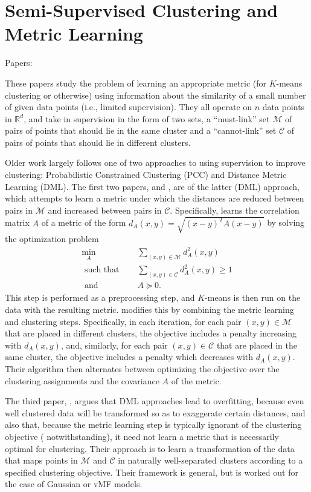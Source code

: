 \documentclass{article} %
\newcommand{\R}{\mathbb{R}}                         %
\newcommand{\C}{\mathcal{C}}                        %
\newcommand{\M}{\mathcal{M}}                        %
\begin{document}
\section{Semi-Supervised Clustering and Metric Learning}
Papers:
    \cite{xing02metriclearning,
          bilenko04metriclearning,
          gopal14supervisedclust}

These papers study the problem of learning an appropriate metric (for
$K$-means clustering or otherwise) using information about the similarity of
a small number of given data points (i.e., limited supervision). They all
operate on $n$ data points in $\R^d$, and take in supervision in the form of
two sets, a ``must-link'' set $\M$ of pairs of points that should lie in the
same cluster and a ``cannot-link'' set $\C$ of pairs of points that should lie
in different clusters.

Older work largely follows one of two approaches to using supervision to
improve clustering: Probabilistic Constrained Clustering (PCC) and Distance
Metric Learning (DML). The first two papers, \cite{xing02metriclearning} and
\cite{bilenko04metriclearning}, are of the latter (DML) approach, which
attempts to learn a metric under which the distances are reduced between pairs
in $\M$ and increased between pairs in $\C$. Specifically,
\cite{xing02metriclearning} learns the correlation matrix $A$ of a metric
of the form $d_A(x,y) = \sqrt{(x - y)^TA(x - y)}$ by solving the optimization
problem
\begin{align*}
\min_A                      & \sum_{(x,y) \in \M} d_A^2(x,y)        \\
\mbox{ such that } \quad    & \sum_{(x,y) \in \C} d_A^2(x,y) \geq 1 \\
\mbox{ and }       \quad    & A \succeq 0.
\end{align*}
This step is performed as a preprocessing step, and $K$-means is then run on
the data with the resulting metric. \cite{bilenko04metriclearning} modifies
this by combining the metric learning and clustering steps. Specifically, in
each iteration, for each pair $(x,y) \in \M$ that are placed in different
clusters, the objective includes a penalty increasing with $d_A(x,y)$, and,
similarly, for each pair $(x,y) \in \C$ that are placed in the same cluster,
the objective includes a penalty which decreases with $d_A(x,y)$. Their
algorithm then alternates between optimizing the objective over the clustering
assignments and the covariance $A$ of the metric.

The third paper, \cite{gopal14supervisedclust}, argues that DML approaches lead
to overfitting, because even well clustered data will be transformed so as to
exaggerate certain distances, and also that, because the metric learning step
is typically ignorant of the clustering objective
(\cite{bilenko04metriclearning} notwithstanding), it need not learn a metric
that is necessarily optimal for clustering. Their approach is to learn a
transformation of the data that maps points in $\M$ and $\C$ in naturally
well-separated clusters according to a specified clustering objective. Their
framework is general, but is worked out for the case of Gaussian or vMF models.
\end{document}
